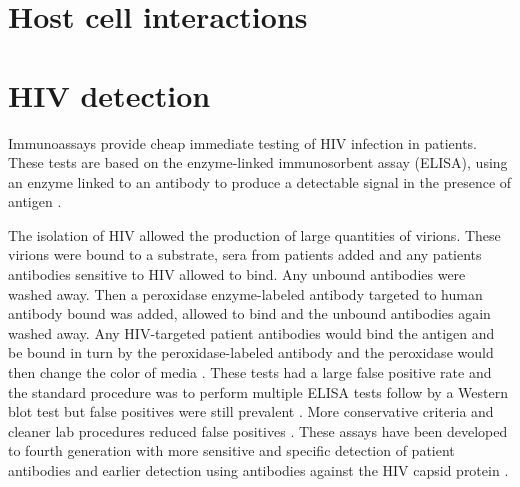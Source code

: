 \documentclass[../sherrill-Mix_thesis.tex]{subfiles}
\begin{document}

\section{Host cell interactions}



\section{HIV detection}
	Immunoassays provide cheap immediate testing of HIV infection in patients. These tests are based on the enzyme-linked immunosorbent assay (ELISA), using an enzyme linked to an antibody to produce a detectable signal in the presence of antigen \citep{Yalow1960,Engvall1971,VanWeemen1971}. %
	
	The isolation of HIV \citep{Barre-Sinoussi1983,Gallo1983,Popovic1984,Levy1984} allowed the production of large quantities of virions. These virions were bound to a substrate, sera from patients added and any patients antibodies sensitive to HIV allowed to bind. Any unbound antibodies were washed away. Then a peroxidase enzyme-labeled antibody targeted to human antibody bound was added, allowed to bind and the unbound antibodies again washed away. Any HIV-targeted patient antibodies would bind the antigen and be bound in turn by the peroxidase-labeled antibody and the peroxidase would then change the color of media \citep{Safai1984,Sarngadharan1984,Ward1986}. These tests had a large false positive rate and the standard procedure was to perform multiple ELISA tests follow by a Western blot test \citep{Towbin1979,CDC1985} but false positives were still prevalent \citep{Burke1986}. More conservative criteria and cleaner lab procedures reduced false positives \citep{Burke1988}. These assays have been developed to fourth generation \citep{Chappel2009} with more sensitive and specific detection of patient antibodies and earlier detection using antibodies against the HIV capsid protein \citep{Weber1998,Weber2002}.  
\end{document}
